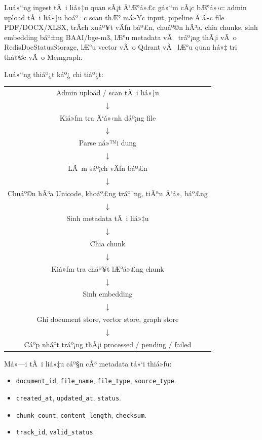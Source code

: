 ﻿\documentclass[12pt,a4paper]{report}
\begin{document}
Luá»“ng ingest tÃ i liá»‡u quan sÃ¡t Ä‘Æ°á»£c gá»“m cÃ¡c bÆ°á»›c: admin upload tÃ i liá»‡u hoáº·c scan thÆ° má»¥c input, pipeline Ä‘á»c file PDF/DOCX/XLSX, trÃ­ch xuáº¥t vÄƒn báº£n, chuáº©n hÃ³a, chia chunks, sinh embedding báº±ng BAAI/bge-m3, lÆ°u metadata vÃ  tráº¡ng thÃ¡i vÃ o RedisDocStatusStorage, lÆ°u vector vÃ o Qdrant vÃ  lÆ°u quan há»‡ tri thá»©c vÃ o Memgraph.

Luá»“ng thiáº¿t káº¿ chi tiáº¿t:

\begin{center}
\begin{tabular}{c}
Admin upload / scan tÃ i liá»‡u \\
$\downarrow$ \\
Kiá»ƒm tra Ä‘á»‹nh dáº¡ng file \\
$\downarrow$ \\
Parse ná»™i dung \\
$\downarrow$ \\
LÃ m sáº¡ch vÄƒn báº£n \\
$\downarrow$ \\
Chuáº©n hÃ³a Unicode, khoáº£ng tráº¯ng, tiÃªu Ä‘á», báº£ng \\
$\downarrow$ \\
Sinh metadata tÃ i liá»‡u \\
$\downarrow$ \\
Chia chunk \\
$\downarrow$ \\
Kiá»ƒm tra cháº¥t lÆ°á»£ng chunk \\
$\downarrow$ \\
Sinh embedding \\
$\downarrow$ \\
Ghi document store, vector store, graph store \\
$\downarrow$ \\
Cáº­p nháº­t tráº¡ng thÃ¡i processed / pending / failed
\end{tabular}
\end{center}

Má»—i tÃ i liá»‡u cáº§n cÃ³ metadata tá»‘i thiá»ƒu:

\begin{itemize}
    \item \texttt{document\_id}, \texttt{file\_name}, \texttt{file\_type}, \texttt{source\_type}.
    \item \texttt{created\_at}, \texttt{updated\_at}, \texttt{status}.
    \item \texttt{chunk\_count}, \texttt{content\_length}, \texttt{checksum}.
    \item \texttt{track\_id}, \texttt{valid\_status}.
\end{itemize}
\end{document}
